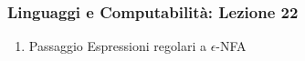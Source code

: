 




\begin{frame}[fragile]
	\frametitle{Linguaggi e Computabilità: Lezione 22}
\begin{enumerate}
\item
Passaggio Espressioni regolari a $\epsilon$-NFA
\end{enumerate}
\end{frame}




